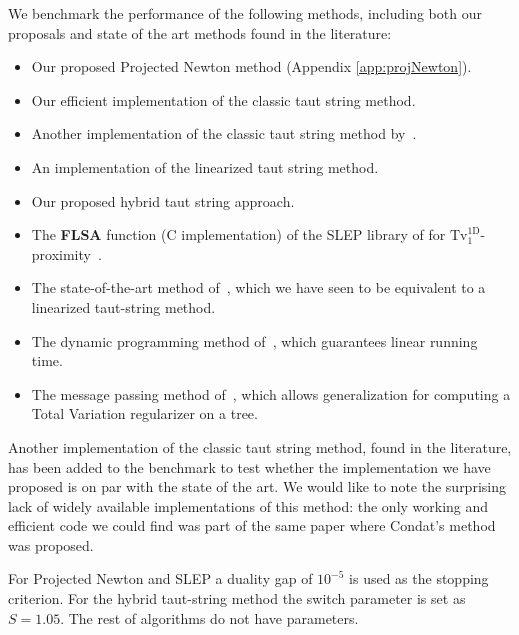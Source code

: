 \documentclass[twoside,11pt]{article}
\newcommand{\tvell}{\text{Tv}}
\newcommand{\oned}{\text{1D}}
\numberwithin{equation}{section}
\numberwithin{theorem}{section}
\begin{document}
We benchmark the performance of the following methods, including both our proposals and state of the art methods found in the literature:
\begin{itemize}
\setlength{\itemsep}{0pt}
 \item Our proposed Projected Newton method (Appendix \ref{app:projNewton}).
 \item Our efficient implementation of the classic taut string method.
 \item Another implementation of the classic taut string method by~\citet{fastTV}.
 \item An implementation of the linearized taut string method.
 \item Our proposed hybrid taut string approach.
 \item The {\bf FLSA} function (C implementation) of the SLEP library of \citet{slep} for $\tvell_1^{\oned}$-proximity~\citep{liuYe10}.
 \item The state-of-the-art method of~\citet{fastTV}, which we have seen to be equivalent to a linearized taut-string method.
 \item The dynamic programming method of~\citet{dpTV}, which guarantees linear running time.
 \item The message passing method of~\citet{Kolmogorov16}, which allows generalization for computing a Total Variation regularizer on a tree.
\end{itemize}

Another implementation of the classic taut string method, found in the literature, has been added to the benchmark to test whether the implementation we have proposed is on par with the state of the art. We would like to note the surprising lack of widely available implementations of this method: the only working and efficient code we could find was part of the same paper where Condat's method was proposed.

For Projected Newton and SLEP a duality gap of $10^{-5}$ is used as the stopping criterion. For the hybrid taut-string method the switch parameter is set as $S=1.05$. The rest of algorithms do not have parameters.
\end{document}
